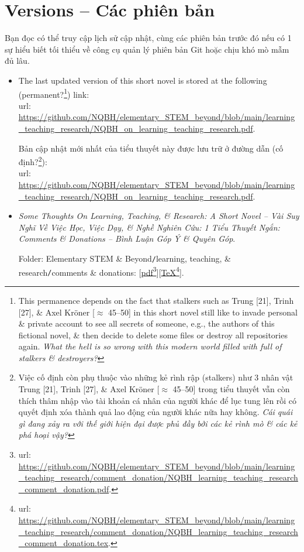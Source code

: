 \documentclass[12pt,twoside]{book}
\begin{document}
\section{Versions -- Các phiên bản}
Bạn đọc có thể truy cập lịch sử cập nhật, cùng các phiên bản trước đó nếu có 1 sự hiểu biết tối thiểu về công cụ quản lý phiên bản Git hoặc chịu khó mò mẫm đủ lâu.
\begin{itemize}
	\item The last updated version of this short novel is stored at the following (permanent?\footnote{This permanence depends on the fact that stalkers such as {\sf Trung [21], Trinh [27]}, \& {\sf Axel Kr\"oner [$\approx$ 45--50]} in this short novel still like to invade personal \& private account to see all secrets of someone, e.g., the authors of this fictional novel, \& then decide to delete some files or destroy all repositories again. {\it What the hell is so wrong with this modern world filled with full of stalkers \& destroyers?}}) link:\\{\sc url}: {\sf\small\url{https://github.com/NQBH/elementary_STEM_beyond/blob/main/learning_teaching_research/NQBH_on_learning_teaching_research.pdf}}.
	
	Bản cập nhật mới nhất của tiểu thuyết này được lưu trữ ở đường dẫn (cố định?\footnote{Việc cố định còn phụ thuộc vào những kẻ rình rập (stalkers) như 3 nhân vật {\sf Trung [21], Trinh [27]}, \& {\sf Axel Kr\"oner [$\approx$ 45--50]} trong tiểu thuyết vẫn còn thích thâm nhập vào tài khoản cá nhân của người khác để lục tung lên rồi có quyết định xóa thành quả lao động của người khác nữa hay không. {\it Cái quái gì đang xảy ra với thế giới hiện đại được phủ đầy bởi các kẻ rình mò \& các kẻ phá hoại vậy?}}):\\{\sc url}: {\sf\small\url{https://github.com/NQBH/elementary_STEM_beyond/blob/main/learning_teaching_research/NQBH_on_learning_teaching_research.pdf}}.
	\item {\it Some Thoughts On Learning, Teaching, \& Research: A Short Novel -- Vài Suy Nghĩ Về Việc Học, Việc Dạy, \& Nghề Nghiên Cứu: 1 Tiểu Thuyết Ngắn: Comments \& Donations -- Bình Luận Góp Ý \& Quyên Góp}.
	
	Folder: {\sf Elementary STEM \& Beyond{\tt/}learning, teaching, \& research{\tt/}comments \& donations}: [\href{https://github.com/NQBH/elementary_STEM_beyond/blob/main/learning_teaching_research/comment_donation/NQBH_learning_teaching_research_comment_donation.pdf}{pdf}\footnote{{\sc url}: \url{https://github.com/NQBH/elementary_STEM_beyond/blob/main/learning_teaching_research/comment_donation/NQBH_learning_teaching_research_comment_donation.pdf}.}][\href{https://github.com/NQBH/elementary_STEM_beyond/blob/main/learning_teaching_research/comment_donation/NQBH_learning_teaching_research_comment_donation.tex}{\TeX}\footnote{{\sc url}: \url{https://github.com/NQBH/elementary_STEM_beyond/blob/main/learning_teaching_research/comment_donation/NQBH_learning_teaching_research_comment_donation.tex}.}].
\end{itemize}
\end{document}

